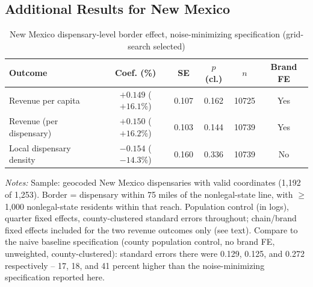 \documentclass[12pt]{article}
\begin{document}
\subsection{Additional Results for New Mexico}
\label{app:nm}


\begin{table}[htbp]
\centering
\caption{New Mexico dispensary-level border effect, noise-minimizing specification (grid-search selected)}
\label{tab:nm_dispensary_border_best}
\footnotesize
\begin{tabular}{lccccc}
\toprule
Outcome & Coef. (\%) & SE & $p$ (cl.) & $n$ & Brand FE \\
\midrule
Revenue per capita & $+0.149$ ($+16.1\%$) & 0.107 & 0.162 & 10725 & Yes \\
Revenue (per dispensary) & $+0.150$ ($+16.2\%$) & 0.103 & 0.144 & 10739 & Yes \\
Local dispensary density & $-0.154$ ($-14.3\%$) & 0.160 & 0.336 & 10739 & No \\
\bottomrule
\end{tabular}
\begin{minipage}{0.98\textwidth}
\vspace{0.3em}
\footnotesize
\textit{Notes:} Sample: geocoded New Mexico dispensaries with valid coordinates (1,192 of 1,253). Border =
dispensary within 75 miles of the nonlegal-state line, with $\geq$1,000 nonlegal-state residents within that
reach. Population control (in logs), quarter fixed effects, county-clustered standard errors throughout;
chain/brand fixed effects included for the two revenue outcomes only (see text). Compare to the naive
baseline specification (county population control, no brand FE, unweighted, county-clustered): standard
errors there were 0.129, 0.125, and 0.272 respectively -- 17, 18, and 41 percent higher than the
noise-minimizing specification reported here.
\end{minipage}
\end{table}
\end{document}
